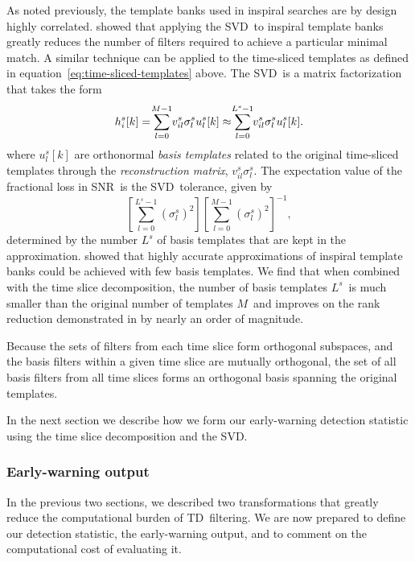 \documentclass[preprint2]{aastex}
\newcommand{\SNR}{SNR}%
\newcommand{\numtmps}{\ensuremath{M}}
\newcommand{\SVD}{SVD}%
\newcommand{\svdtmps}[1]{\ensuremath{L^#1}}
\newcommand{\numsvdtmps}{\svdtmps{s}}
\newcommand{\TD}{TD}%
\def\clap#1{\hbox to 0pt{\hss#1\hss}}
\def\mathclap{\mathpalette\mathclapinternal}
\def\mathclapinternal#1#2{\clap{$\mathsurround=0pt#1{#2}$}}
\begin{document}
As noted previously, the template banks used in inspiral searches are by design
highly correlated.  \citet{Cannon:2010p10398} showed that applying the \SVD\
to inspiral template banks greatly reduces the number of filters required to achieve a
particular minimal match.  A similar technique can be applied to the time-sliced
templates as defined in equation~\ref{eq:time-sliced-templates} above.  The \SVD\
is a matrix factorization that takes the form
%
\begin{equation}
h_i^s[k] = \sum_{\mathclap{l=0}}^{\mathclap{M-1}} v_{il}^s \sigma_l^s u_l^s[k] \approx \sum_{\mathclap{l=0}}^{\mathclap{L^s-1}} v_{il}^s \sigma_l^s u_l^s[k].
\label{eq:svddecomp}
\end{equation}
where $u_l^s[k]$ are orthonormal \emph{basis templates} related to the original
time-sliced templates through the \emph{reconstruction matrix}, $v_{il}^s\sigma_l^s$.
The expectation value of the fractional loss in \SNR\ is the \SVD\ tolerance, given by
%
\begin{equation*}
\left[ \sum_{l=0}^{L^s-1} \left( \sigma_l^s \right)^2 \right]\left[ \sum_{l=0}^{M-1} \left( \sigma_l^s \right)^2 \right]^{-1},
\end{equation*}
%
determined by the number $\numsvdtmps$ of basis templates that are kept in
the approximation.  \citet{Cannon:2010p10398}
showed that highly accurate approximations of inspiral template banks could be
achieved with few basis templates.  We find that when combined with the
time slice decomposition, the number of basis templates \numsvdtmps\ is much
smaller than the original number of templates \numtmps\ and improves on the
rank reduction demonstrated in \citet{Cannon:2010p10398} by nearly an order
of magnitude.

Because the sets of filters from each time slice form orthogonal subspaces, and
the basis filters within a given time slice are mutually orthogonal, the set of
all basis filters from all time slices forms an orthogonal basis spanning the
original templates.

In the next section we describe how we form our early-warning detection
statistic using the time slice decomposition and the \SVD.

\subsubsection{Early-warning output}

In the previous two sections, we described two transformations that greatly
reduce the computational burden of \TD\ filtering.  We are now prepared to
define our detection statistic, the early-warning output, and to comment on the
computational cost of evaluating it.
\end{document}
